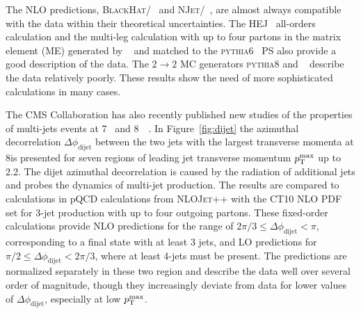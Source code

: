 \documentclass{PoS}
\providecommand{\NLOJETPP} {{\textsc{NLOJet++}}\xspace}
\providecommand{\NJET} {{\textsc{NJet}}\xspace}
\providecommand{\BLACKHAT} {{\textsc{BlackHat}}\xspace}
\providecommand{\HEJ} {{\textsc{HEJ}}\xspace}
\providecommand{\dphi}{\ensuremath{\Delta\phi_\text{dijet}}\xspace}
\providecommand{\ptmax}{\ensuremath{\pt^{\text{max}}}\xspace}
\providecommand{\PYTHIAS} {{\textsc{pythia6}}\xspace}
\providecommand{\PYTHIAE} {{\textsc{pythia8}}\xspace}
\begin{document}
The NLO predictions, \BLACKHAT/\SHERPA~\cite{Berger:2008sj,Bern:2011ep} and
\NJET/\SHERPA~\cite{Badger:2012pg,Badger:2012pf}, are almost always compatible with the data within their 
theoretical uncertainties. The \HEJ~\cite{Andersen:2009nu,Andersen:2011hs} all-orders calculation and the multi-leg calculation with up to four partons in the
matrix element (ME) generated by \MADGRAPH~\cite{Alwall:2014hca} and matched to the \PYTHIAS~\cite{Sjostrand:2006za} PS also provide a good description of
the data. The $2\to 2$ MC generators \PYTHIAE and \HERWIGpp~\cite{Bahr:2008pv}
 describe the data relatively poorly. These results show the need of more sophisticated calculations in many cases. 

The CMS Collaboration has also recently published new studies of the properties of multi-jets events at 7\TeV~\cite{Khachatryan:2016udy, Khachatryan:2015xwa} and
8~\TeV~\cite{Khachatryan:2016hkr}. In Figure~\ref{fig:dijet} the azimuthal decorrelation $\dphi$ between the two jets with the largest transverse momenta at
8\TeV is presented for seven regions of leading jet transverse momentum \ptmax up to 2.2\TeV. The dijet azimuthal decorrelation is caused by
the radiation of additional jets and probes the dynamics of multi-jet production. The results are compared to calculations in
pQCD calculations from \NLOJETPP with the CT10 NLO PDF set for 3-jet production with up to four outgoing partons.
These fixed-order calculations provide NLO predictions for the range of
$2\pi/3 \leq \dphi < \pi$, corresponding to a final state with at least 3 jets, and LO predictions for $\pi/2 \leq \dphi <
2\pi/3$, where at least 4-jets must be present. The predictions are normalized separately in these two region and
describe the data well over several order of magnitude, though they increasingly deviate from data for lower values of
\dphi, especially at low \ptmax. 
\end{document}
